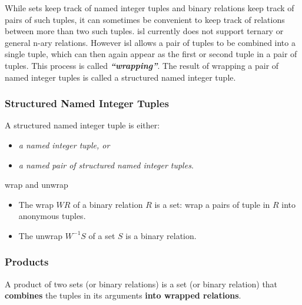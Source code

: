 While sets keep track of named integer tuples and binary relations keep track of pairs of such tuples, it can sometimes be convenient to keep track of relations between more than two such tuples. isl currently does not support ternary or general n-ary relations. However isl allows a pair of tuples to be combined into a single tuple, which can then again appear as the first or second tuple in a pair of tuples. This process is called \textcolor{vr}{\textbf{\emph{“wrapping”}}}. The result of wrapping a pair of named integer tuples is called a \textcolor{vr}{structured named integer tuple}.

\subsubsection{Structured Named Integer Tuples}

\textcolor{vr}{
A structured named integer tuple is either:
\begin{itemize}
  \item \textit{a named integer tuple, or}
  \item \textit{a named pair of structured named integer tuples}.
\end{itemize}
}

wrap and unwrap

\begin{itemize}
  \item The wrap $\mathit{W}R$ of a binary relation $R$ is a set: wrap a pairs of tuple in $R$ into anonymous tuples.
  \item The unwrap $\mathit{W}^{-1}S$ of a set $S$ is a binary relation.
\end{itemize}

\subsubsection{Products}

A product of two sets (or binary relations) is a set (or binary relation) that \textbf{combines} the tuples in its arguments \textbf{into wrapped relations}.

